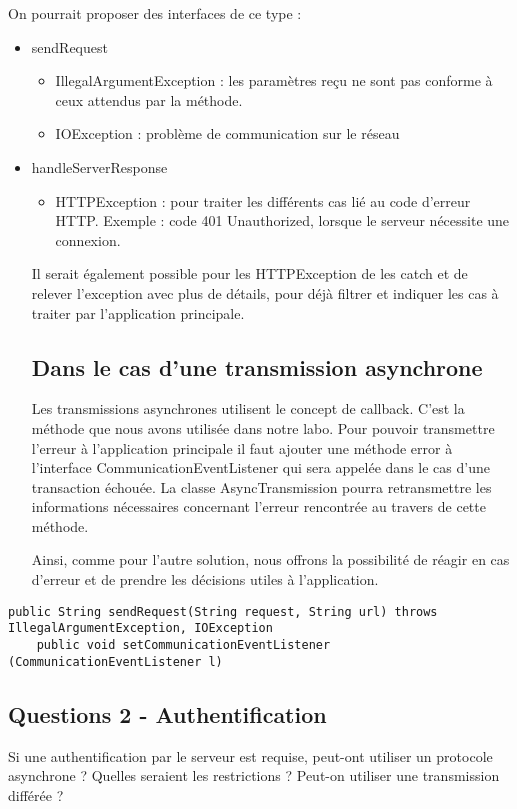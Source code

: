 \documentclass[francais,12pt]{article}
\begin{document}
	On pourrait proposer des interfaces de ce type : 
	\begin{itemize}
		\item sendRequest
		\begin{itemize}
			\item IllegalArgumentException : les paramètres reçu ne sont pas conforme à ceux attendus par la méthode.
			\item IOException : problème de communication sur le réseau
		\end{itemize}
		\item handleServerResponse
		\begin{itemize}
			\item HTTPException : pour traiter les différents cas lié au code d'erreur HTTP. Exemple : code 401 Unauthorized, lorsque le serveur nécessite une connexion.
		\end{itemize}
	
	Il serait également possible pour les HTTPException de les catch et de relever l'exception avec plus de détails, pour déjà filtrer et indiquer les cas à traiter par l'application principale.
	
	\subsection{Dans le cas d’une transmission asynchrone}
	Les transmissions asynchrones utilisent le concept de callback. C’est la méthode que nous avons utilisée dans notre labo. Pour pouvoir transmettre l’erreur à l’application principale il faut ajouter une méthode error à l’interface CommunicationEventListener qui sera appelée dans le cas d’une transaction échouée. La classe AsyncTransmission pourra retransmettre les informations nécessaires concernant l’erreur rencontrée au travers de cette méthode. 
	
	Ainsi, comme pour l’autre solution, nous offrons la possibilité de réagir en cas d’erreur et de prendre les décisions utiles à l’application. 
	
		
	\end{itemize}
	
	\begin{lstlisting}[style=javaCode]
	public String sendRequest(String request, String url) throws IllegalArgumentException, IOException 
	public void setCommunicationEventListener (CommunicationEventListener l) 
	\end{lstlisting}
	
	\subsection*{Questions 2 - Authentification}
	Si une authentification par le serveur est requise, peut-ont utiliser un protocole asynchrone ? Quelles seraient les restrictions ? Peut-on utiliser une transmission différée ?
	
\end{document}
